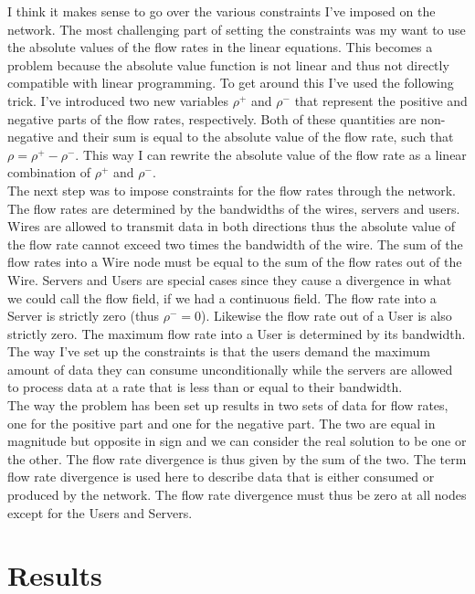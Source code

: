 \documentclass[10pt, titlepage, a4paper]{article}
\begin{document}
I think it makes sense to go over the various constraints I've imposed on the network. The most challenging part of setting 
the constraints was my want to use the absolute values of the flow rates in the linear equations. This becomes a problem 
because the absolute value function is not linear and thus not directly compatible with linear programming. To get around 
this I've used the following trick. I've introduced two new variables $\rho^+$ and $\rho^-$ that represent the positive and
negative parts of the flow rates, respectively. Both of these quantities are non-negative and their sum is equal to the
absolute value of the flow rate, such that $\rho = \rho^+ - \rho^-$. This way I can rewrite the absolute value of the flow rate
as a linear combination of $\rho^+$ and $\rho^-$. \\ 

The next step was to impose constraints for the flow rates through the 
network. The flow rates are determined by the bandwidths of the wires, servers and users. Wires are allowed to transmit 
data in both directions thus the absolute value of the flow rate cannot exceed two times the bandwidth of the wire. The sum 
of the flow rates into a Wire node must be equal to the sum of the flow rates out of the Wire. Servers and Users are special 
cases since they cause a divergence in what we could call the flow field, if we had a continuous field. The flow rate into a
Server is strictly zero (thus $\rho^- = 0$). Likewise the flow rate out of a User is also strictly zero. The maximum flow
rate into a User is determined by its bandwidth. The way I've set up the constraints is that the users demand the 
maximum amount of data they can consume unconditionally while the servers are allowed to process data at
a rate that is less than or equal to their bandwidth. \\

The way the problem has been set up results in two sets of data for flow rates, one for the positive part and
one for the negative part. The two are equal in magnitude but opposite in sign and we can consider the real 
solution to be one or the other. The flow rate divergence is thus given by the sum of the two. The term flow rate 
divergence is used here to describe data that is either consumed or produced by the network. The flow rate divergence
must thus be zero at all nodes except for the Users and Servers. 

\section{Results}
\end{document}
